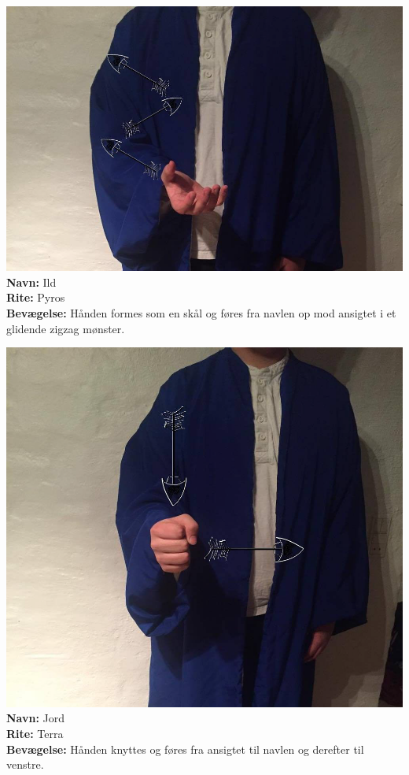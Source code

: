\begin{rite*}[Ild]
    \centering
    \includegraphics[width=\textwidth]{mainstuff/riteBilleder/Ild.png}
\Large \textbf{Navn:} Ild\\
\textbf{Rite:} Pyros\\
\textbf{Bevægelse:} Hånden formes som en skål og føres fra navlen op mod ansigtet i et glidende zigzag mønster.
\end{rite*}

\begin{rite*}[Jord]
    \centering
    \includegraphics[width=\textwidth]{mainstuff/riteBilleder/Jord.png}
\Large \textbf{Navn:} Jord\\
\textbf{Rite:} Terra\\
\textbf{Bevægelse:} Hånden knyttes og føres fra ansigtet til navlen og derefter til venstre.
\end{rite*}

